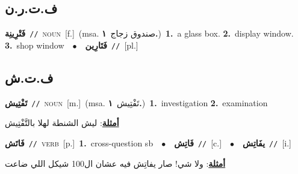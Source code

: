 \documentclass[10pt,a4paper,twoside]{article} %
\begin{document}
\begin{multicols}{2}
\vspace{-3mm}
\subsection*{\color{blue}\foreignlanguage{arabic}{ف.ت.ر.ن}\color{blue}{ (ntws)}} 

{\setlength\topsep{0pt}\textbf{\foreignlanguage{arabic}{فَتْرِينِة}}\ {\color{gray}\texttt{//}\color{black}}\ \textsc{noun}\ [f.]\ \color{gray}(msa. \foreignlanguage{arabic}{صندوق زجاج}~\foreignlanguage{arabic}{\textbf{١.}})\color{black}\ \textbf{1.}~a glass box.  \textbf{2.}~display window.  \textbf{3.}~shop window\ \ $\bullet$\ \ \setlength\topsep{0pt}\textbf{\foreignlanguage{arabic}{فَتَارِين}}\ {\color{gray}\texttt{//}\color{black}}\ [pl.]\ } \vspace{2mm}

\vspace{-3mm}
\subsection*{\color{blue}\foreignlanguage{arabic}{ف.ت.ش}\color{blue}{}} 

{\setlength\topsep{0pt}\textbf{\foreignlanguage{arabic}{تَفْتِيش}}\ {\color{gray}\texttt{//}\color{black}}\ \textsc{noun}\ [m.]\ \color{gray}(msa. \foreignlanguage{arabic}{تَفْتِيش}~\foreignlanguage{arabic}{\textbf{١.}})\color{black}\ \textbf{1.}~investigation  \textbf{2.}~examination\  \begin{flushright}\color{gray}\foreignlanguage{arabic}{\textbf{\underline{\foreignlanguage{arabic}{أمثلة}}}: ليش الشنطة لهلا بالتَّفْتِيش}\end{flushright}\color{black}} \vspace{2mm}

{\setlength\topsep{0pt}\textbf{\foreignlanguage{arabic}{فَاتَش}}\ {\color{gray}\texttt{//}\color{black}}\ \textsc{verb}\ [p.]\ \textbf{1.}~cross-question sb\ \ $\bullet$\ \ \setlength\topsep{0pt}\textbf{\foreignlanguage{arabic}{فَاتِش}}\ {\color{gray}\texttt{//}\color{black}}\ [c.]\ \ $\bullet$\ \ \setlength\topsep{0pt}\textbf{\foreignlanguage{arabic}{يفَاتِش}}\ {\color{gray}\texttt{//}\color{black}}\ [i.]\  \begin{flushright}\color{gray}\foreignlanguage{arabic}{\textbf{\underline{\foreignlanguage{arabic}{أمثلة}}}: ولا شي! صار يفاتِش فيه عشان ال100 شيكل اللي ضاعت}\end{flushright}\color{black}} \vspace{2mm}


\end{multicols}
\end{document}
